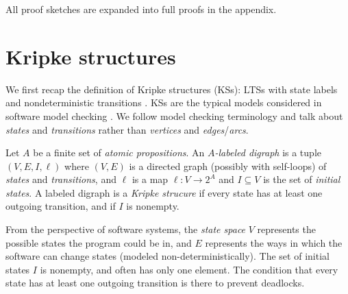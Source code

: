 \documentclass[runngingheads]{llncs}
\begin{document}
All proof sketches are expanded into full proofs in the appendix.

\section{Kripke structures} \label{sec:KS}

We first recap the definition of Kripke structures (KSs): LTSs with state labels and nondeterministic transitions \cite{kripke1963semantical}. KSs are the typical models considered in software model checking \cite{baier2008principles}. We follow model checking terminology and talk about \emph{states} and \emph{transitions} rather than \emph{vertices} and \emph{edges}/\emph{arcs}.

\begin{definition}
Let $A$ be a finite set of \emph{atomic propositions}. An \emph{$A$-labeled digraph} is a tuple $(V,E,I,\ell)$ where $(V,E)$ is a directed graph (possibly with self-loops) of \emph{states} and \emph{transitions}, and $\ell$ is a map $\ell\colon V \rightarrow 2^A$ and $I \subseteq V$ is the set of \emph{initial states}. A labeled digraph is a \emph{Kripke strucure} if every state has at least one outgoing transition, and if $I$ is nonempty.
\end{definition}

From the perspective of software systems, the \emph{state space} $V$ represents the possible states the program could be in, and $E$ represents the ways in which the software can change states (modeled non-deterministically). The set of initial states $I$ is nonempty, and often has only one element. The condition that every state has at least one outgoing transition is there to prevent deadlocks.
\end{document}
